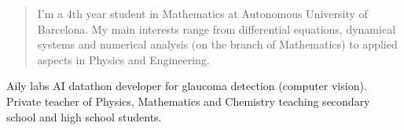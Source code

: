 \documentclass[10pt,a4paper,ragged2e,withhyper]{altacv}
\begin{document}
\begin{paracol}{2}







  \newpage

  \switchcolumn

  \begin{quote}
    I'm a 4th year student in Mathematics at Autonomous University of Bar\-ce\-lo\-na. My main interests range from differential equations, dynamical systems and numerical analysis (on the branch of Mathematics) to applied aspects in Physics and Engineering.
  \end{quote}

  Aily labs AI datathon developer for glaucoma detection (computer vision).
  \divider
  Private teacher of Physics, Mathematics and Chemistry teaching secondary school and high school students.


\end{paracol}
\end{document}
